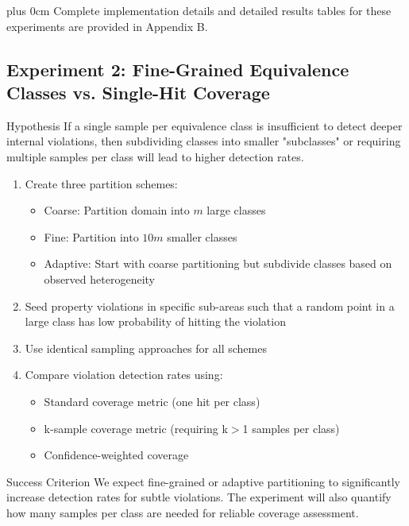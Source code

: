 \documentclass[11pt,a4paper]{article}
\newcommand{\justifytext}{\leftskip=0pt \rightskip=0pt plus 0cm}
\begin{document}
\justifytext
Complete implementation details and detailed results tables for these experiments are provided in Appendix B.

\subsection{Experiment 2: Fine-Grained Equivalence Classes vs. Single-Hit Coverage}

\begin{theorembox}{Hypothesis}
If a single sample per equivalence class is insufficient to detect deeper internal violations, then subdividing classes into smaller "subclasses" or requiring multiple samples per class will lead to higher detection rates.
\end{theorembox}

\begin{tcolorbox}[
  colback=blue!5!white,
  colframe=blue!75!black,
  title=Experimental Design,
  fonttitle=\bfseries
]
\begin{enumerate}
\item Create three partition schemes:
   \begin{itemize}
   \item Coarse: Partition domain into $m$ large classes
   \item Fine: Partition into $10m$ smaller classes
   \item Adaptive: Start with coarse partitioning but subdivide classes based on observed heterogeneity
   \end{itemize}
\item Seed property violations in specific sub-areas such that a random point in a large class has low probability of hitting the violation
\item Use identical sampling approaches for all schemes
\item Compare violation detection rates using:
   \begin{itemize}
   \item Standard coverage metric (one hit per class)
   \item k-sample coverage metric (requiring k$>$1 samples per class)
   \item Confidence-weighted coverage
   \end{itemize}
\end{enumerate}
\end{tcolorbox}

\begin{definitionbox}{Success Criterion}
We expect fine-grained or adaptive partitioning to significantly increase detection rates for subtle violations. The experiment will also quantify how many samples per class are needed for reliable coverage assessment.
\end{definitionbox}
\end{document}
